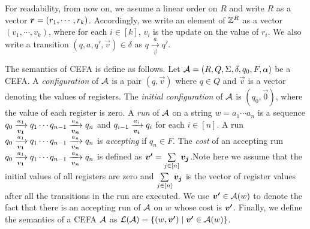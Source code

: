 For readability, from now on, we assume a linear order on $R$ and write $R$ as a vector $\myvec{r} = (r_1, \cdots, r_k)$. Accordingly, we write an element of $\mathbb{Z}^R$ as a vector $(v_1, \cdots, v_k)$, where for each $i \in [k]$, $v_i$ is the update on the value of $r_i$. We also write a transition $(q, a, q', \vec{v}) \in \delta$ as $q \xrightarrow[\vec{v}]{a} q'$.


The semantics of CEFA is define as follows. Let $\mathcal{A} = (R, Q, \Sigma, \delta, q_0, F, \alpha)$ be a CEFA. 
A \emph{configuration} of $\mathcal{A}$ is a pair $(q, \vec{v})$ where $q \in Q$ and $\vec{v}$ is a vector denoting the values of registers.  
The \emph{initial configuration} of $\mathcal{A}$ is $(q_0, \vec{0})$, where the value of each register is zero. 
A \emph{run} of $\mathcal{A}$ on a string $w = a_1 \cdots a_n$ is a sequence $q_0 \xrightarrow[\myvec{v_1}]{a_1} q_1 \cdots q_{n-1}\xrightarrow[\myvec{v_n}]{a_n} q_n$ and $q_{i-1} \xrightarrow[\myvec{v_i}]{a_i} q_i$ for each $i \in [n]$. A run $q_0 \xrightarrow[\myvec{v_1}]{a_1} q_1 \cdots q_{n-1}\xrightarrow[\myvec{v_n}]{a_n} q_n$ is \emph{accepting} if $q_n \in F$. The \emph{cost} of an accepting run $q_0 \xrightarrow[\myvec{v_1}]{a_1} q_1 \cdots q_{n-1}\xrightarrow[\myvec{v_n}]{a_n} q_n$ is defined as $\myvec{v'} = \sum \limits_{j \in [n]} \myvec{v_j}$.Note here we assume that the initial values of all registers are zero and $\sum \limits_{j \in [n]} \myvec{v_j}$ is the vector of register values after all the transitions in the run are executed.  We use $\myvec{v'} \in \aut(w)$ to denote the fact that there is an accepting run of $\mathcal{A}$ on $w$ whose cost is $\myvec{v'}$. 
Finally, we define the semantics of a CEFA $\mathcal{A}$ as $\Lang(\aut) = \{(w, \myvec{v'}) \mid  \myvec{v'} \in \aut(w)\}$.  

%

